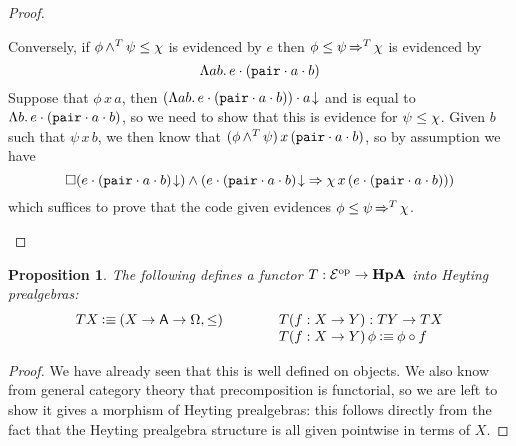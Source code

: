 \documentclass[11pt]{article}
\newtheorem{prop}[thrm]{Proposition}
\begin{document}
\begin{proof}
\begin{itemize}
      Conversely, if \({{\phi}\mathop{{\land^{T}}}{\psi}}\leq{\chi}\) is evidenced by \(e\)
      then \({\phi}\leq{{\psi}\mathop{\Rightarrow^{T}}{\chi}}\) is evidenced by
      \[
        \Lambda{ab}.\,{{e}\cdot{({{\texttt{pair}}\cdot{a}}\cdot{b})}}
      \]
      Suppose that \(\phi\,x\,a\), then \({{{(\Lambda{ab}.\,{{e}\cdot{({{\texttt{pair}}\cdot{a}}\cdot{b})}})}\cdot{a}}\!\downarrow}\)
      and is equal to \(\Lambda{b}.\,{{e}\cdot{({{\texttt{pair}}\cdot{a}}\cdot{b})}}\),
      so we need to show that this is evidence for \({\psi}\leq{\chi}\).
      Given \(b\) such that \(\psi\,x\,b\), we then know that
      \(({\phi}\mathop{{\land^{T}}}{\psi})\,x\,({{\texttt{pair}}\cdot{a}}\cdot{b})\), so
      by assumption we have
      \[
      \IAnd%
      {\IBox{(\ITotal{\IAp{e}{(\IAp{\IAp{\IPairCode}{a}}{b})}})}}%
      {(\IImplies%
      {\ITotal{\IAp{e}{(\IAp{\IAp{\IPairCode}{a}}{b})}}}%
      {\chi\,x\,(\IAp{e}{(\IAp{\IAp{\IPairCode}{a}}{b})})})%
      }
      \]
      which suffices to prove that the code given evidences
      \({\phi}\leq{{\psi}\mathop{\Rightarrow^{T}}{\chi}}\).
  \end{itemize}
\end{proof}

\begin{prop}
  The following defines a functor \(T : {\mathcal{E}}^\text{op} \to \textbf{HpA}\) into Heyting
  prealgebras:
  \[\begin{array}{lll}
    {T{X}} \mathbin{\vcentcolon\equiv} {({{X}\to{{{\ensuremath{\mathsf{A}}}\to{\Omega}}}}, \leq)}&\qquad&
    {T{(f:X\to Y)}} : TY \to TX\\
    &&{T{(f:X\to Y)}\,\phi} \mathbin{\vcentcolon\equiv} {\phi \circ f}
  \end{array}\]
\end{prop}
\begin{proof}
  We have already seen that this is well defined on objects.
  We also know from general category theory that precomposition is functorial,
  so we are left to show it gives a morphism of Heyting prealgebras:
  this follows directly from the fact that the Heyting prealgebra structure is
  all given pointwise in terms of \(X\).
\end{proof}
\end{document}
